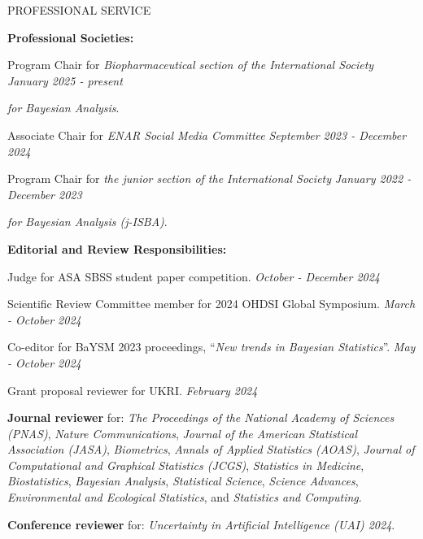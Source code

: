 \documentclass{resume} %
\newcommand{\thisYear}[1]{
	#1
}
\begin{document}
\begin{rSection}{PROFESSIONAL SERVICE}
	
	\hspace*{-0.2in}\textbf{Professional Societies:}
	
	Program Chair for \emph{Biopharmaceutical section of the International Society} \hfill {\em January 2025 - present}
	
	\vspace{-0.1in}
	\emph{for Bayesian Analysis}.
	
	Associate Chair for \emph{ENAR Social Media Committee}  \hfill {\em September 2023 - December 2024}

		\smallskip
	
	Program Chair for \emph{the junior section of the International Society} \hfill {\em January 2022 - December 2023}
	
	\vspace{-0.1in}
	\emph{for Bayesian Analysis (j-ISBA)}.
	
\medskip 

 \hspace*{-0.2in}\textbf{Editorial and Review Responsibilities:}
 
 	Judge for ASA SBSS student paper competition. 	 \hfill {\em October - December 2024}
 	
 	Scientific Review Committee member for 2024 OHDSI Global Symposium. 	\hfill {\em March - October 2024}
 	
 	\smallskip 
	
 Co-editor for BaYSM 2023 proceedings, ``\emph{New trends in Bayesian Statistics}''.	\hfill {\em May - October 2024}

    \smallskip 
    
 
    Grant proposal reviewer for UKRI.	\hfill {\em February 2024}

    
    \smallskip 
    
    \textbf{Journal reviewer} for: \emph{The Proceedings of the National Academy of Sciences (PNAS)}, \emph{Nature Communications}, \emph{Journal of the American Statistical Association (JASA)}, \emph{Biometrics}, \emph{Annals of Applied Statistics (AOAS)}, \emph{Journal of Computational and Graphical Statistics (JCGS)}, \emph{Statistics in Medicine}, \emph{Biostatistics}, \emph{Bayesian Analysis},  \emph{Statistical Science},  \emph{Science Advances}, \emph{Environmental and Ecological Statistics}, and \emph{Statistics and Computing}. 
    
 \smallskip 
%    
    \textbf{Conference reviewer} for: \emph{Uncertainty in Artificial Intelligence (UAI) 2024}. 
    

\end{rSection}
\end{document}
